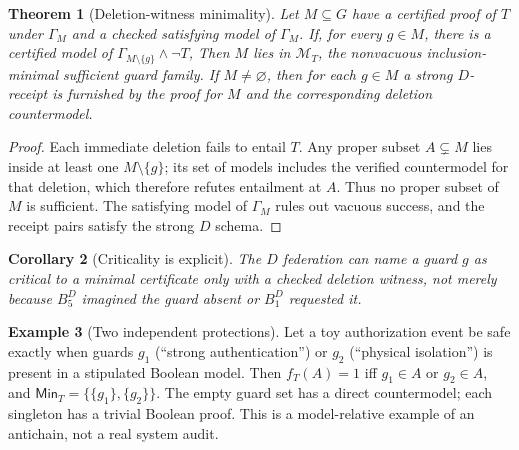 \documentclass[11pt,letterpaper,oneside]{book}
\newtheorem{theorem}{Theorem}[chapter]
\newtheorem{corollary}[theorem]{Corollary}
\theoremstyle{definition}
\newtheorem{example}[theorem]{Example}
\theoremstyle{remark}
\newcommand{\Min}{\mathsf{Min}}
\begin{document}
\begin{theorem}[Deletion-witness minimality]\label{thm:deletion}
Let $M\subseteq G$ have a certified proof of $T$ under $\Gamma_M$
and a checked satisfying model of $\Gamma_M$. If, for every $g\in M$,
there is a certified model of
$\Gamma_{M\setminus\{g\}}\land\neg T$, Then $M$ lies in $\mathcal M_T$, the nonvacuous
inclusion-minimal sufficient guard family. If $M\ne\varnothing$, then
for each $g\in M$ a strong $D$-receipt is furnished by the proof
for $M$ and the corresponding deletion countermodel.
\end{theorem}
\begin{proof}
Each immediate deletion fails to entail $T$. Any proper subset
$A\subsetneq M$ lies inside at least one $M\setminus\{g\}$; its
set of models includes the verified countermodel for that deletion,
which therefore refutes entailment at $A$. Thus no proper subset of
$M$ is sufficient. The satisfying model of $\Gamma_M$ rules out
vacuous success, and the receipt pairs satisfy the strong $D$ schema.\end{proof}
\begin{corollary}[Criticality is explicit]
The $D$ federation can name a guard $g$ as critical to a minimal
certificate only with a checked deletion witness, not merely because
$B_5^D$ imagined the guard absent or $B_1^D$ requested it.\end{corollary}

\begin{example}[Two independent protections]
Let a toy authorization event be safe exactly when guards $g_1$
(``strong authentication'') or $g_2$ (``physical isolation'') is
present in a stipulated Boolean model. Then $f_T(A)=1$ iff
$g_1\in A$ or $g_2\in A$, and
$\Min_T=\{\{g_1\},\{g_2\}\}$. The empty guard set has a direct
countermodel; each singleton has a trivial Boolean proof. This is a
model-relative example of an antichain, not a real system audit.
\end{example}
\end{document}
